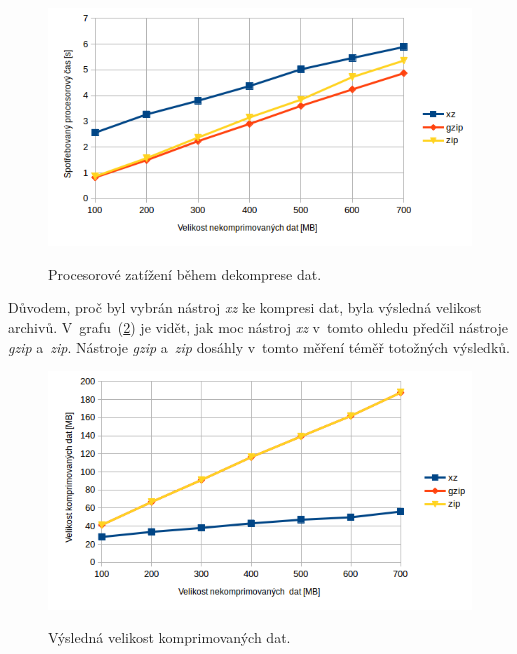 \begin{figure}[H]
    \begin{center}
        \label{graph:dekomprese}
        \includegraphics[width=1.0\textwidth]{obrazky-figures/graph_dekomprese.png}
        \caption{Procesorové zatížení během dekomprese dat.}
    \end{center}
\end{figure}

Důvodem, proč byl vybrán nástroj \textit{xz} ke kompresi dat, byla výsledná
velikost archivů. V~grafu~(\ref{graph:vysledna_velikost}) je vidět,
jak moc nástroj \textit{xz} v~tomto ohledu předčil nástroje \textit{gzip} a~\textit{zip}.
Nástroje \textit{gzip} a~\textit{zip} dosáhly v~tomto měření téměř totožných výsledků.

\begin{figure}[H]
    \begin{center}
        \label{graph:vysledna_velikost}
        \includegraphics[width=1.0\textwidth]{obrazky-figures/graph_vysledna_velikost.png}
        \caption{Výsledná velikost komprimovaných dat.}
    \end{center}
\end{figure}

